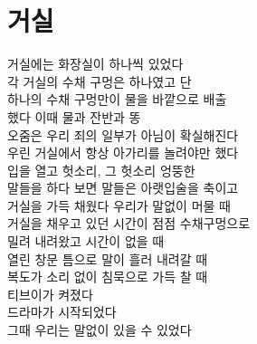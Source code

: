 \hypertarget{uxac70uxc2e4}{%

\section{거실}\label{uxac70uxc2e4}}



거실에는 화장실이 하나씩 있었다\\

각 거실의 수채 구멍은 하나였고 단\\

하나의 수채 구멍만이 물을 바깥으로 배출\\

했다 이때 물과 잔반과 똥\\

오줌은 우리 죄의 일부가 아님이 확실해진다\\

우린 거실에서 항상 아가리를 놀려야만 했다\\

입을 열고 헛소리, 그 헛소리 엉뚱한\\

말들을 하다 보면 말들은 아랫입술을 축이고\\

거실을 가득 채웠다 우리가 말없이 머물 때\\

거실을 채우고 있던 시간이 점점 수채구멍으로\\

밀려 내려왔고 시간이 없을 때\\

열린 창문 틈으로 말이 흘러 내려갈 때\\

복도가 소리 없이 침묵으로 가득 찰 때\\

티브이가 켜졌다\\

드라마가 시작되었다\\

그때 우리는 말없이 있을 수 있었다

